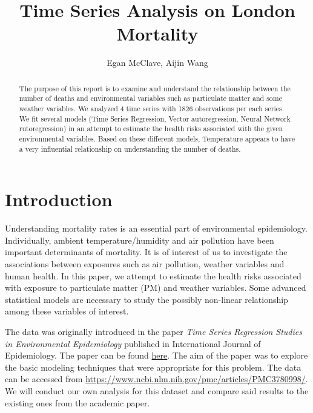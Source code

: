 \documentclass{article}\usepackage[]{graphicx}\usepackage[]{color}
\title{Time Series Analysis on London Mortality}
\author{Egan McClave, Aijin Wang}
\begin{document}
\maketitle

\tableofcontents
\newpage

\listoffigures
\listoftables
\newpage

\clearpage
\setcounter{page}{1}

\begin{abstract}

The purpose of this report is to examine and understand the relationship between the number of deaths and environmental variables such as particulate matter and some weather variables. We analyzed 4 time series with 1826 observations per each series. We fit several models (Time Series Regression, Vector autoregression, Neural Network rutoregression) in an attempt to estimate the health risks associated with the given environmental variables. Based on these different models, Temperature appears to have a very influential relationship on understanding the number of deaths.
\end{abstract}

\section{Introduction} \label{s:introduction}

Understanding mortality rates is an essential part of environmental epidemiology. Individually, ambient temperature/humidity and air pollution have been important determinants of mortality. It is of interest of us to investigate the associations between exposures such as air pollution, weather variables and human health. In this paper, we attempt to estimate the health risks associated with exposure to particulate matter (PM) and weather variables. Some advanced statistical models are necessary to study the possibly non-linear relationship among these variables of interest.

The data was originally introduced in the paper \textit{Time Series Regression Studies in Environmental Epidemiology} published in International Journal of Epidemiology. The paper can be found \href{https://www.ncbi.nlm.nih.gov/pmc/articles/PMC3780998/}{here}. The aim of the paper was to explore the basic modeling techniques that were appropriate for this problem. The data can be accessed from \url{https://www.ncbi.nlm.nih.gov/pmc/articles/PMC3780998/}. We will conduct our own analysis for this dataset and compare said results to the existing ones from the academic paper.
\end{document}
